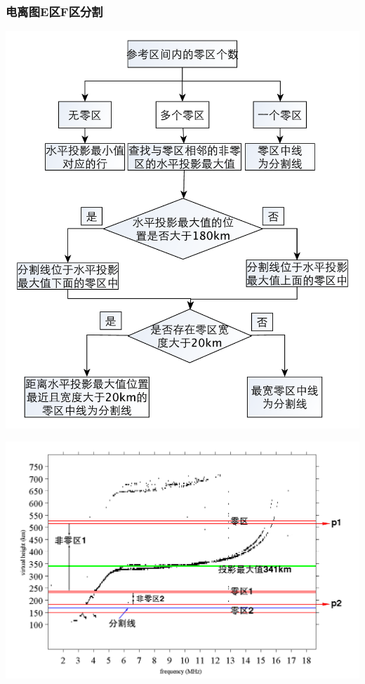 \documentclass[notheorems,mathserif,table,compress]{beamer}  %
\begin{document}
\begin{frame}
 \frametitle{电离图E区F区分割 }
\begin{center}
  \begin{minipage}[t]{0.45\linewidth}  
    \includegraphics[width=1\linewidth]{newnewE区F区分割方案.pdf} 
  \end{minipage}
  \begin{minipage}[t]{0.5\linewidth} 
    \includegraphics[width=1\linewidth]{201303121545p40s1-EregionExample6.png} 
  \end{minipage}
\end{center}
\end{frame}
\end{document}
